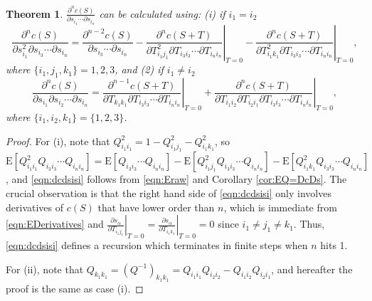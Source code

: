 \documentclass[10pt]{article}
\newtheorem{theorem}{Theorem}
\newcommand{\expect}[1]{\ensuremath{\mathrm{E}\left[ #1 \right]}}
\begin{document}
\begin{theorem}
	$\frac{\partial^n c(S)}{\partial s_{i_1} \cdots \partial s_{i_n}}$ can be calculated using: (i) if $i_1 = i_2$
	\begin{equation} \label{eqn:dcdsisi}
		\frac{\partial^n c(S)}{\partial s_{i_1}^2 \partial s_{i_3} \cdots \partial s_{i_n}} = \frac{\partial^{n-2} c(S)}{\partial s_{i_3} \cdots \partial s_{i_n}} - \left. \frac{\partial^n c(S+T)}{\partial T_{i_1j_1}^2 \partial T_{i_3i_3} \cdots \partial T_{i_ni_n}} \right|_{T=0} - \left. \frac{\partial^n c(S+T)}{\partial T_{i_1k_1}^2 \partial T_{i_3i_3} \cdots \partial T_{i_ni_n}} \right|_{T=0},
	\end{equation}
	where $\{i_1,j_1,k_1\} = {1,2,3}$, and (2) if $i_1 \neq i_2$
	\begin{equation}
		\frac{\partial^n c(S)}{\partial s_{i_1} \partial s_{i_2} \cdots \partial s_{i_n}} = \left. \frac{\partial^{n-1} c(S+T)}{\partial T_{k_1k_1} \partial T_{i_3i_3} \cdots \partial T_{i_ni_n}} \right|_{T=0} + \left. \frac{\partial^n c(S+T)}{\partial T_{i_1i_2} \partial T_{i_2i_1} \partial T_{i_3i_3} \cdots \partial T_{i_ni_n}} \right|_{T=0},
	\end{equation}
	where $\{i_1,i_2,k_1\} = \{1,2,3\}$.
\end{theorem}
\begin{proof}
	For (i), note that $Q_{i_1i_1}^2 = 1 - Q_{i_1j_1}^2 - Q_{i_1k_1}^2$, so $\expect{Q_{i_1i_1}^2Q_{i_3i_3} \cdots Q_{i_ni_n}} = \expect{Q_{i_3i_3} \cdots Q_{i_ni_n}} - \expect{Q_{i_1j_1}^2Q_{i_3i_3} \cdots Q_{i_ni_n}} - \expect{Q_{i_1k_1}^2Q_{i_3i_3} \cdots Q_{i_ni_n}}$, and \eqref{eqn:dcdsisi} follows from \eqref{eqn:Eraw} and Corollary \ref{cor:EQ=DcDs}.
	The crucial observation is that the right hand side of \eqref{eqn:dcdsisi} only involves derivatives of $c(S)$ that have lower order than $n$, which is immediate from \eqref{eqn:EDerivatives} and $\left.\frac{\partial s_\alpha}{\partial T_{i_1j_1}}\right|_{T=0} = \left.\frac{\partial s_\alpha}{\partial T_{i_1k_1}}\right|_{T=0} = 0$ since $i_1 \neq j_1 \neq k_1$.
	Thus, \eqref{eqn:dcdsisi} defines a recursion which terminates in finite steps when $n$ hits 1.
	
	For (ii), note that $Q_{k_1k_1} = (Q^{-1})_{k_1k_1} = Q_{i_1i_1}Q_{i_2i_2}-Q_{i_1i_2}Q_{i_2i_1}$, and hereafter the proof is the same as case (i).
\end{proof}
\end{document}
